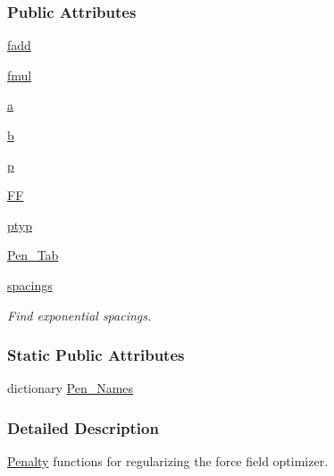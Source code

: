 \subsubsection*{Public Attributes}
\begin{DoxyCompactItemize}
\item 
\hyperlink{classsrc_1_1objective_1_1Penalty_ac3c1f33c407b580bbb1d5c91a82c8801}{fadd}
\item 
\hyperlink{classsrc_1_1objective_1_1Penalty_aec8ff392d779b29af0c58b4b021e2252}{fmul}
\item 
\hyperlink{classsrc_1_1objective_1_1Penalty_ae4a8c21e4d3f5c7e5d1861dec88a35cd}{a}
\item 
\hyperlink{classsrc_1_1objective_1_1Penalty_a24f907fe33df0c1da1cbf50795d64ec9}{b}
\item 
\hyperlink{classsrc_1_1objective_1_1Penalty_ae623d28435d898a1eb331350e0c11882}{p}
\item 
\hyperlink{classsrc_1_1objective_1_1Penalty_a3c2af904607eca375ee4e9826e57b716}{FF}
\item 
\hyperlink{classsrc_1_1objective_1_1Penalty_acc858beb8126e12b33df0b58ba51b74d}{ptyp}
\item 
\hyperlink{classsrc_1_1objective_1_1Penalty_ae0d1f6e2d30d3452a47825d332f41cc3}{Pen\+\_\+\+Tab}
\item 
\hyperlink{classsrc_1_1objective_1_1Penalty_a54f8696cb98aabcd6da11025b1f954a5}{spacings}
\begin{DoxyCompactList}\small\item\em Find exponential spacings. \end{DoxyCompactList}\end{DoxyCompactItemize}
\subsubsection*{Static Public Attributes}
\begin{DoxyCompactItemize}
\item 
dictionary \hyperlink{classsrc_1_1objective_1_1Penalty_aa4376227d51b15dd02140dc80117eacc}{Pen\+\_\+\+Names}
\end{DoxyCompactItemize}


\subsubsection{Detailed Description}
\hyperlink{classsrc_1_1objective_1_1Penalty}{Penalty} functions for regularizing the force field optimizer. 

